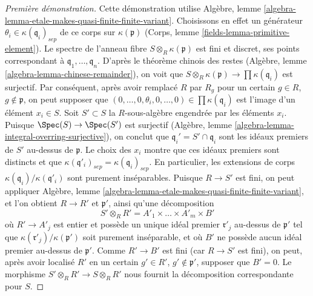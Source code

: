 \begin{proof}[Première démonstration]
Cette démonstration utilise
Algèbre, lemme \ref{algebra-lemma-etale-makes-quasi-finite-finite-variant}.
Choisissons en effet un générateur $\theta_i \in \kappa(\mathfrak q_i)_{sep}$
de ce corps sur $\kappa(\mathfrak p)$
(Corps, lemme \ref{fields-lemma-primitive-element}).
Le spectre de l'anneau fibre $S \otimes_R \kappa(\mathfrak p)$
est fini et discret, ses points correspondant à
$\mathfrak q_1, \ldots, \mathfrak q_n$.
D'après le théorème chinois des restes
(Algèbre, lemme \ref{algebra-lemma-chinese-remainder}),
on voit que $S \otimes_R \kappa(\mathfrak p) \to \prod \kappa(\mathfrak q_i)$
est surjectif. Par conséquent, après avoir remplacé $R$ par $R_g$ pour un certain
$g \in R$, $g \not \in \mathfrak p$, on peut supposer que
$(0, \ldots, 0, \theta_i, 0, \ldots, 0) \in \prod \kappa(\mathfrak q_i)$
est l'image d'un élément $x_i \in S$.
Soit $S' \subset S$ la $R$-sous-algèbre engendrée par les éléments $x_i$.
Puisque $\Spec(S) \to \Spec(S')$ est surjectif
(Algèbre, lemme \ref{algebra-lemma-integral-overring-surjective}),
on conclut que
$\mathfrak q_i' = S' \cap \mathfrak q_i$ sont les idéaux premiers de
$S'$ au-dessus de $\mathfrak p$. Le choix des $x_i$ montre que
ces idéaux premiers sont distincts et que
$\kappa(\mathfrak q'_i)_{sep} = \kappa(\mathfrak q_i)_{sep}$.
En particulier, les extensions de corps
$\kappa(\mathfrak q_i)/\kappa(\mathfrak q'_i)$ sont purement
inséparables.
Puisque $R \to S'$ est fini, on peut appliquer
Algèbre, lemme \ref{algebra-lemma-etale-makes-quasi-finite-finite-variant},
et l'on obtient $R \to R'$ et $\mathfrak p'$, ainsi qu'une décomposition
$$
S' \otimes_R R' = A'_1 \times \ldots \times A'_m \times B'
$$
où $R' \to A'_j$ est entier et possède un unique idéal premier
$\mathfrak r'_j$ au-dessus de $\mathfrak p'$ tel que
$\kappa(\mathfrak r'_j)/\kappa(\mathfrak p')$
soit purement inséparable, et où $B'$ ne possède aucun idéal premier
au-dessus de $\mathfrak p'$. Comme $R' \to B'$ est fini
(car $R \to S'$ est fini), on peut,
après avoir localisé $R'$ en un certain $g' \in R'$, $g' \not \in \mathfrak p'$,
supposer que $B' = 0$. Le morphisme $S' \otimes_R R' \to S \otimes_R R'$
nous fournit la décomposition correspondante pour $S$.
\end{proof}

